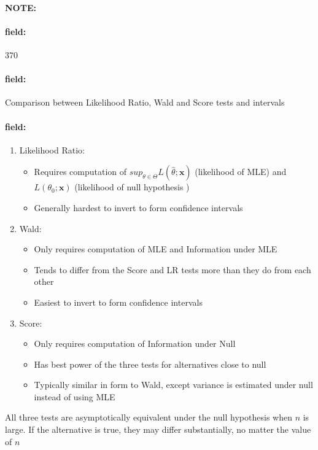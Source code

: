 \documentclass[12pt]{article}
\newenvironment{note}{\paragraph{NOTE:}}{}
\newenvironment{field}{\paragraph{field:}}{}
\begin{document}
\begin{note}
    \begin{field}
        \tiny 370
    \end{field}
    \begin{field}
        Comparison between Likelihood Ratio, Wald and Score tests and intervals
    \end{field}
    \begin{field}
        \begin{enumerate}
          \item Likelihood Ratio:
          \begin{itemize}
            \item Requires computation of $sup_{\theta \in \Theta} L(\hat{\theta};\mathbf{x})$ (likelihood of MLE) and $L(\theta_0; \mathbf{x})$ (likelihood of null hypothesis )
            \item Generally hardest to invert to form confidence intervals
          \end{itemize}
          \item Wald:
          \begin{itemize}
            \item Only requires computation of MLE and Information under MLE
            \item Tends to differ from the Score and LR tests more than they do from each other
            \item Easiest to invert to form confidence intervals
          \end{itemize}
          \item Score:
          \begin{itemize}
            \item Only requires computation of Information under Null
            \item Has best power of the three tests for alternatives close to null
            \item Typically similar in form to Wald, except variance is estimated under null instead of using MLE
          \end{itemize}
        \end{enumerate}
        All three tests are asymptotically equivalent under the null hypothesis when $n$ is large. If the alternative is true, they may differ substantially, no matter the value of $n$
    \end{field}
\end{note}
\end{document}
